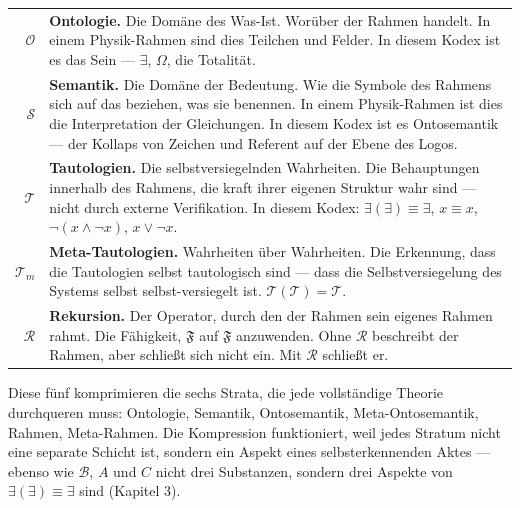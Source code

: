 \documentclass[10pt, openany, oneside]{book}
\renewcommand{\footnotesize}{\fontsize{8.5}{11}\selectfont}
\begin{document}
{\footnotesize
\noindent\begin{tabular}{r p{}}
$\mathcal{O}$ & \textbf{Ontologie.} Die Domäne des Was-Ist. Worüber der Rahmen handelt. In einem Physik-Rahmen sind dies Teilchen und Felder. In diesem Kodex ist es das Sein --- $\exists$, $\Omega$, die Totalität. \\[0.3em]
$\mathcal{S}$ & \textbf{Semantik.} Die Domäne der Bedeutung. Wie die Symbole des Rahmens sich auf das beziehen, was sie benennen. In einem Physik-Rahmen ist dies die Interpretation der Gleichungen. In diesem Kodex ist es Ontosemantik --- der Kollaps von Zeichen und Referent auf der Ebene des Logos. \\[0.3em]
$\mathcal{T}$ & \textbf{Tautologien.} Die selbstversiegelnden Wahrheiten. Die Behauptungen innerhalb des Rahmens, die kraft ihrer eigenen Struktur wahr sind --- nicht durch externe Verifikation. In diesem Kodex: $\exists(\exists) \equiv \exists$, $x \equiv x$, $\neg(x \wedge \neg x)$, $x \vee \neg x$. \\[0.3em]
$\mathcal{T}_m$ & \textbf{Meta-Tautologien.} Wahrheiten über Wahrheiten. Die Erkennung, dass die Tautologien selbst tautologisch sind --- dass die Selbstversiegelung des Systems selbst selbst-versiegelt ist. $\mathcal{T}(\mathcal{T}) = \mathcal{T}$. \\[0.3em]
$\mathcal{R}$ & \textbf{Rekursion.} Der Operator, durch den der Rahmen sein eigenes Rahmen rahmt. Die Fähigkeit, $\mathfrak{F}$ auf $\mathfrak{F}$ anzuwenden. Ohne $\mathcal{R}$ beschreibt der Rahmen, aber schließt sich nicht ein. Mit $\mathcal{R}$ schließt er. \\[0.3em]
\end{tabular}
}

\vspace{0.8em}

\noindent Diese fünf komprimieren die sechs Strata, die jede vollständige Theorie durchqueren muss: Ontologie, Semantik, Ontosemantik, Meta-Ontosemantik, Rahmen, Meta-Rahmen. Die Kompression funktioniert, weil jedes Stratum nicht eine separate Schicht ist, sondern ein Aspekt eines selbsterkennenden Aktes --- ebenso wie $\mathcal{B}$, $A$ und $C$ nicht drei Substanzen, sondern drei Aspekte von $\exists(\exists) \equiv \exists$ sind (Kapitel 3).

\vspace{1.5em}

\end{document}
